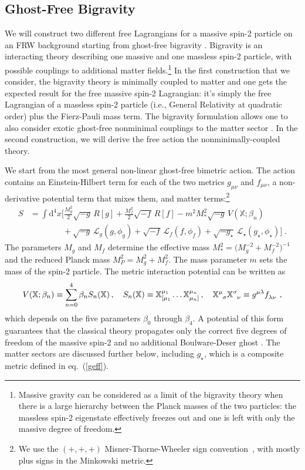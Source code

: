 \documentclass[11pt,a4paper]{article}
\newcommand{\bes}[1]{\begin{equation}\begin{split} #1 \end{split}\end{equation}}
\newcommand{\Lcal}{\mathcal{L}}
\newcommand{\Xbb}{\mathbb{X}}
\newcommand{\MP}{M_P}
\newcommand{\bea}{\begin{eqnarray}}
\newcommand{\eea}{\end{eqnarray}}
\newcommand{\eref}[1]{eq.~(\ref{#1})}
\begin{document}
\subsection{Ghost-Free Bigravity}
\label{sub:bigravity}

We will construct two different free Lagrangians for a massive spin-2 particle on an FRW background starting from ghost-free bigravity \cite{Hassan:2011zd}.  Bigravity is an interacting theory describing one massive and one massless spin-2 particle, with possible couplings to additional matter fields.\footnote{Massive gravity can be considered as a limit of the bigravity theory when there is a large hierarchy between the Planck masses of the two particles: the massless spin-2 eigenstate effectively freezes out and one is left with only the massive degree of freedom.} In the first construction that we consider, the bigravity theory is minimally coupled to matter and one gets the expected result for the free massive spin-2 Lagrangian: it's simply the free Lagrangian of a massless spin-2 particle (i.e., General Relativity at quadratic order) plus the Fierz-Pauli mass term.  The bigravity formulation allows one to also consider exotic ghost-free nonminimal couplings to the matter sector \cite{deRham:2014naa}. In the second construction, we will derive the free action the nonminimally-coupled theory.

We start from the most general non-linear ghost-free bimetric action.  The action contains an Einstein-Hilbert term for each of the two metrics $g_{\mu\nu}$ and $f_{\mu\nu}$, a non-derivative potential term that mixes them, and matter terms:\footnote{We use the $(+,+,+)$ Misner-Thorne-Wheeler sign convention~\cite{MTW:1973}, with mostly plus signs in the Minkowski metric.}
\bes{
\label{bigL}
	S
	& = \int \! \mathrm{d}^4 x \biggl[ \frac{M_g^2}{2} \sqrt{-g}\,R[g]+ \frac{M_f^2}{2} \sqrt{-f}\,R[f] -m^2 M_*^2 \sqrt{-g} \,V(\Xbb; \beta_n) \\
	& \qquad \qquad 
	+ \sqrt{-g} \,\Lcal_{g}(g,\phi_g)+\sqrt{-f} \,\Lcal_{f}(f,\phi_f)+\sqrt{-g_\star} \,\Lcal_{\star}(g_\star,\phi_\star) \biggr] 
	\;.
}
The parameters $M_g$ and $M_f$ determine the effective mass $M_\ast^2 = \bigl( M_g^{-2} + M_f^{-2} \bigr)^{-1}$ and the reduced Planck mass $\MP^2 = M_g^2+M_f^2$.  The mass parameter $m$ sets the mass of the spin-2 particle.  The metric interaction potential can be written as 
\bea
\label{pot}
	V(\Xbb; \beta_n) \equiv \sum_{n=0}^{4} \beta_n S_n(\Xbb) \, , \quad 
	S_n(\Xbb) \equiv \Xbb^{\mu_1}_{[ \mu_1} \hdots \Xbb^{\mu_n}_{\mu_n ]} \, , \quad 
	\Xbb\indices{^\mu_\sigma}\Xbb\indices{^\sigma_\nu} \equiv g\indices{^\mu^\lambda} f\indices{_\lambda_\nu} 
	\;,
\eea
which depends on the five parameters $\beta_0$ through $\beta_4$.  
A potential of this form guarantees that the classical theory propagates only the correct five degrees of freedom of the massive spin-2 \cite{Hassan:2011hr} and no additional Boulware-Deser ghost \cite{Boulware:1972yco}. 
The matter sectors are discussed further below, including $g_\star$, which is a composite metric defined in \eref{geff}.  
\end{document}
